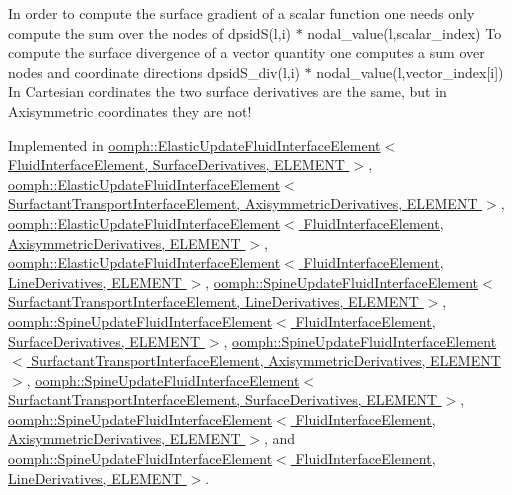 In order to compute the surface gradient of a scalar function one needs only compute the sum over the nodes of dpsid\+S(l,i) $\ast$ nodal\+\_\+value(l,scalar\+\_\+index) To compute the surface divergence of a vector quantity one computes a sum over nodes and coordinate directions dpsid\+S\+\_\+div(l,i) $\ast$ nodal\+\_\+value(l,vector\+\_\+index\mbox{[}i\mbox{]}) In Cartesian cordinates the two surface derivatives are the same, but in Axisymmetric coordinates they are not! 

Implemented in \hyperlink{classoomph_1_1ElasticUpdateFluidInterfaceElement_ae9df6c11ccb63dc04c0d5ca655fe1482}{oomph\+::\+Elastic\+Update\+Fluid\+Interface\+Element$<$ Fluid\+Interface\+Element, Surface\+Derivatives, E\+L\+E\+M\+E\+N\+T $>$}, \hyperlink{classoomph_1_1ElasticUpdateFluidInterfaceElement_ae9df6c11ccb63dc04c0d5ca655fe1482}{oomph\+::\+Elastic\+Update\+Fluid\+Interface\+Element$<$ Surfactant\+Transport\+Interface\+Element, Axisymmetric\+Derivatives, E\+L\+E\+M\+E\+N\+T $>$}, \hyperlink{classoomph_1_1ElasticUpdateFluidInterfaceElement_ae9df6c11ccb63dc04c0d5ca655fe1482}{oomph\+::\+Elastic\+Update\+Fluid\+Interface\+Element$<$ Fluid\+Interface\+Element, Axisymmetric\+Derivatives, E\+L\+E\+M\+E\+N\+T $>$}, \hyperlink{classoomph_1_1ElasticUpdateFluidInterfaceElement_ae9df6c11ccb63dc04c0d5ca655fe1482}{oomph\+::\+Elastic\+Update\+Fluid\+Interface\+Element$<$ Fluid\+Interface\+Element, Line\+Derivatives, E\+L\+E\+M\+E\+N\+T $>$}, \hyperlink{classoomph_1_1SpineUpdateFluidInterfaceElement_a75debcd348674d5ea58bfefc0e72b737}{oomph\+::\+Spine\+Update\+Fluid\+Interface\+Element$<$ Surfactant\+Transport\+Interface\+Element, Line\+Derivatives, E\+L\+E\+M\+E\+N\+T $>$}, \hyperlink{classoomph_1_1SpineUpdateFluidInterfaceElement_a75debcd348674d5ea58bfefc0e72b737}{oomph\+::\+Spine\+Update\+Fluid\+Interface\+Element$<$ Fluid\+Interface\+Element, Surface\+Derivatives, E\+L\+E\+M\+E\+N\+T $>$}, \hyperlink{classoomph_1_1SpineUpdateFluidInterfaceElement_a75debcd348674d5ea58bfefc0e72b737}{oomph\+::\+Spine\+Update\+Fluid\+Interface\+Element$<$ Surfactant\+Transport\+Interface\+Element, Axisymmetric\+Derivatives, E\+L\+E\+M\+E\+N\+T $>$}, \hyperlink{classoomph_1_1SpineUpdateFluidInterfaceElement_a75debcd348674d5ea58bfefc0e72b737}{oomph\+::\+Spine\+Update\+Fluid\+Interface\+Element$<$ Surfactant\+Transport\+Interface\+Element, Surface\+Derivatives, E\+L\+E\+M\+E\+N\+T $>$}, \hyperlink{classoomph_1_1SpineUpdateFluidInterfaceElement_a75debcd348674d5ea58bfefc0e72b737}{oomph\+::\+Spine\+Update\+Fluid\+Interface\+Element$<$ Fluid\+Interface\+Element, Axisymmetric\+Derivatives, E\+L\+E\+M\+E\+N\+T $>$}, and \hyperlink{classoomph_1_1SpineUpdateFluidInterfaceElement_a75debcd348674d5ea58bfefc0e72b737}{oomph\+::\+Spine\+Update\+Fluid\+Interface\+Element$<$ Fluid\+Interface\+Element, Line\+Derivatives, E\+L\+E\+M\+E\+N\+T $>$}.



